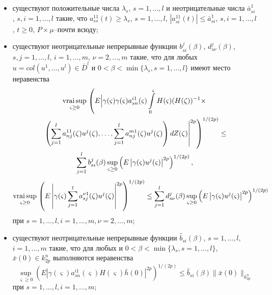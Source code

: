 \begin{itemize}
    \item существуют положительные числа  $ \lambda _s$, $s = 1, \dots, l$ и
    неотрицательные числа $\bar a_{si}^1$, $s,i = 1,
     \dots, l$ такие, что $a^{11}_{ss}(t) \geq
     \lambda _s$, $s = 1,\dots,l$, $|a^{11}_{si}(t)|\leq \bar a^1_{si}$, $s,i = 1, \dots, l$, $t \geq 0$, $P\times\mu$--почти
    всюду;

    \item  существуют неотрицательные непрерывные функции $b_{si}^j(\beta)$,
    $d_{s\nu}^j(\beta)$, $s, j = 1, \dots, l$, $i = 1, \dots, m$, $\nu = 2,
    \dots, m$ такие, что для любых $u = col (u^1, \dots, u^l) \in \bar D^l$
    и $0 < \beta < \min \{\lambda _s, s = 1,
    \dots, l \}$ имеют  место неравенства
\begin{multline*}\mathrel {\mathop
     {\operatorname*{vrai} \sup} \limits _{\varsigma \geq 0}} \left(E\Bigl|\gamma
    (\varsigma)\gamma (\varsigma )a^{i1}_{sn}(\varsigma ) \int \limits
    _{0}^\varsigma H(\varsigma)(H(\zeta))^{-1}\times\Bigr.\right.\\
     \left.\left.\left(\sum \limits _{j=1}^l
    a_{nj}^{11}(\zeta)u^j(\zeta ),\dots,\sum \limits _{j=1}^l
    a_{nj}^{m1}(\zeta)u^j(\zeta )\right)dZ(\zeta )\right|^{2p}\right)^{1/(2p)} \leq\\
    \sum \limits_{j=1}^lb_{si}^j(\beta)\sup \limits_{\varsigma \geq 0}\left (E\left |\gamma
    (\varsigma)u^j(\varsigma)\right |^{2p}\right )^{1/(2p)},
\end{multline*} 
$$
     \mathrel {\mathop {\operatorname*{vrai} \sup}\limits _{\varsigma \geq 0}}
    \left(E\left |\gamma (\varsigma)\sum \limits _{j=1}^l
    a_{sj}^{\nu1}(\zeta)u^j(\zeta )\right |^{2p}\right)^{1/(2p)} \leq
    \sum \limits_{j=1}^ld_{s\nu}^j(\beta)\sup \limits _{\varsigma \geq
    0}\left (E\left |\gamma (\varsigma)u^j(\varsigma)\right |^{2p}\right
    )^{1/(2p)}
$$
    при $s = 1,\dots,l, i = 1, \dots, m , \nu =2,
    \dots, m$;

    \item  существуют неотрицательные непрерывные функции $\hat
    b_{si}(\beta)$, $s= 1, ..., l$, $i= 1, ..., m$ такие,  что для любых
    и $0 < \beta < \min \{\lambda _s, s = 1, \dots, l \}$,  $\bar x(0) \in
    k_{2p}^n$ выполняются неравенства
    \begin{equation*} \sup \limits _{\varsigma \geq 0}\left (E\left |\gamma (\varsigma)
    a^{i1}_{sn}(\varsigma)H(\varsigma) \bar h(0)\right |^{2p}\right
    )^{1/(2p)} \leq \hat b_{si}(\beta)\|\bar x(0)\|_{k^n_{2p}}
    \end{equation*} при $s = 1,\dots,l, i = 1, \dots, m$;


\end{itemize}
